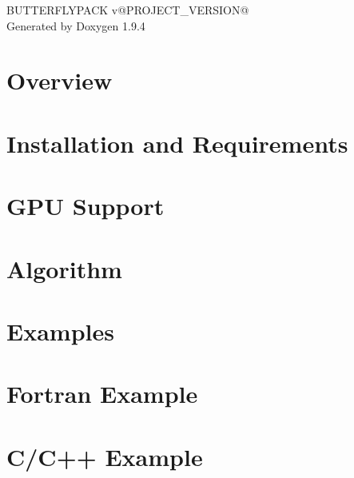 \documentclass[twoside]{book}
\newcommand{\+}{\discretionary{\mbox{\scriptsize$\hookleftarrow$}}{}{}}
\newcommand{\clearemptydoublepage}{%
    \newpage{\pagestyle{empty}\cleardoublepage}%
  }
\begin{document}
  \raggedbottom
    \hypersetup{pageanchor=false,
                bookmarksnumbered=true,
                pdfencoding=unicode
               }
  \begin{titlepage}
  \vspace*{7cm}
  \begin{center}%
  {\Large BUTTERFLYPACK v@\+PROJECT\+\_\+\+VERSION@}\\
  \vspace*{1cm}
  {\large Generated by Doxygen 1.9.4}\\
  \end{center}
  \end{titlepage}
  \clearemptydoublepage
  \tableofcontents
  \clearemptydoublepage
  \hypersetup{pageanchor=true}
\chapter{Overview}
\label{index}\hypertarget{index}{}
\chapter{Installation and Requirements}
\label{installation}

\chapter{GPU Support}
\label{GPU_Support}

\chapter{Algorithm}
\label{algorithm}

\chapter{Examples}
\label{examples}

\chapter{Fortran Example}
\label{Fortran}

\chapter{C/\+C++ Example}
\label{C_C_09_09}

\end{document}
